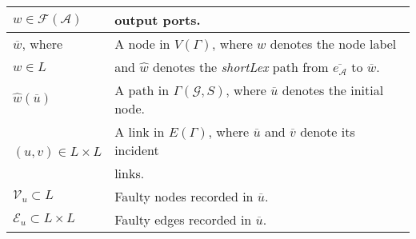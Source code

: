 \begin{table}[t!]
\begin{tabular}[center]{|l|l|}
\multirow{1}{*}{$w\in \mathcal{F}(\mathcal{A})$}   &\multirow{1}{*}{output ports.}\\
\hline
\multirow{1}{*}{$\overline{w}$, where}   &\multirow{1}{*}{A node in $V(\Gamma)$, where $w$ denotes the node label}\\
\multirow{1}{*}{$w\in L$}   &\multirow{1}{*}{and $\widehat{w}$ denotes the \textit{shortLex} path from $\overline{e_\mathcal{A}}$ to $\overline{w}$.}\\
\hline
\multirow{1}{*}{$\widehat{w}(\overline{u})$}   &\multirow{1}{*}{A path in $\Gamma(\mathcal{G},S)$, where $\overline{u}$ denotes the initial node.}\\
\hline
\multirow{2}{*}{$(u,v)\in L\times L$}   &\multirow{1}{*}{A link in $E(\Gamma)$, where $\overline{u}$ and $\overline{v}$ denote its incident}\\
&\multirow{1}{*}{links.}\\
\hline
\multirow{1}{*}{$\mathcal{V}_u\subset L$}   &\multirow{1}{*}{Faulty nodes recorded in $\overline{u}$.}\\
\hline
\multirow{1}{*}{$\mathcal{E}_u\subset L\times L$}   &\multirow{1}{*}{Faulty edges recorded in $\overline{u}$.}\\
\hline
\end{tabular}\\
\end{table}